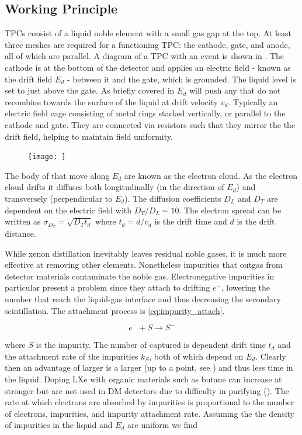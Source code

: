 \subsection{Working Principle}
\label{subsec:tpcs_working_principle}
TPCs consist of a liquid noble element with a small gas gap at the top.  At least three meshes are required for a functioning TPC: the
cathode, gate, and anode, all of which are parallel.  A diagram of a TPC with an event is shown in .  The cathode is
at the bottom of the detector and applies an electric field - known as the drift field $E_{d}$ - between
it and the gate, which is grounded.  The liquid level is set to just above the gate.  As briefly covered in 
$E_{d}$ will push any \electron that do not recombine towards the surface of the liquid at drift velocity $v_{d}$.  Typically an electric
field cage consisting
of metal rings stacked vertically, or parallel to the cathode and gate.  They are connected via resistors such that they mirror the
the drift field, helping to maintain field uniformity.

\begin{figure}
\texttt{[image: ]}
\label{fig:tpcs_tpc}
\end{figure}

The body of \electron that move along $E_{d}$ are known as the electron cloud.  As the electron cloud drifts it diffuses both
longitudinally (in the direction of $E_{d}$) and transversely (perpendicular to $E_{d}$).  The
diffusion coefficients $D_{L}$ and $D_{T}$ are dependent on the electric field with $D_{T}/D_{L} \sim 10$.  The electron spread can
be written as $\sigma_{D_{T}} = \sqrt{D_{T} t_{d}}$ where $t_{d} = d/v_{d}$ is the drift time and $d$ is the drift distance.

While xenon distillation inevitably leaves residual noble gases, it is much more effective at removing other elements.  Nonetheless
impurities that outgas from detector materials contaminate the noble gas.  Electronegative impurities in particular present a problem
since they attach to drifting $e^{-}$,
lowering the number that reach the liquid-gas interface and thus decreasing the secondary scintillation.  The attachment process
is
\eqref{eq:impurity_attach}.

\begin{equation}
e^{-} + S \rightarrow S^{-}
\label{eq:impurity_attach}
\end{equation}

\noindent where $S$ is the impurity.  The number of \electron captured is dependent drift time $t_{d}$ and the
attachment rate of
the impurities $k_{S}$, both of which depend on $E_{d}$.  Clearly then an advantage of larger
\efields is a larger
\vd (up to a point, see ) and thus less time in the liquid.  Doping LXe with organic materials such as butane
can increase \vd at stronger
\efields but are not used in DM detectors due to difficulty in purifying ().  The rate at which electrons are
absorbed by impurities is proportional to the number of electrons, impurities, and impurity attachment rate.  Assuming the the density
of impurities in the liquid and $E_{d}$ are uniform we find

